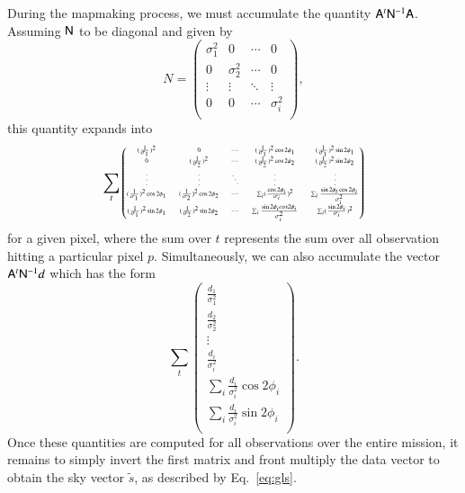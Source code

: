\documentclass{aa}
\newcommand{\A}[0]{\tens{A}}
\newcommand{\N}[0]{\tens{N}}
\begin{document}
During the mapmaking process, we must accumulate the quantity $\A^t\N^{-1}\A$. Assuming $\N$ to be diagonal and given by
\begin{equation}
N = \begin{pmatrix}
\sigma^2_1 & 0 & \cdots & 0 \\
0 & \sigma^2_2 & \cdots & 0 \\
\vdots & \vdots & \ddots & \vdots \\
0 & 0 & \cdots & \sigma^2_i \\
\end{pmatrix},
\end{equation}
this quantity expands into
\begin{equation*}
\begin{tiny}
\sum_t
\begin{pmatrix}
(\frac{1}{\sigma_1})^2 & 0 & \cdots &
(\frac{1}{\sigma_1})^2 \cos2\phi_1 & (\frac{1}{\sigma_1})^2 \sin2\phi_1 \\

0 & (\frac{1}{\sigma_2})^2 & \cdots &
(\frac{1}{\sigma_2})^2 \cos2\phi_2 & (\frac{1}{\sigma_2})^2 \sin2\phi_2 \\

\vdots & \vdots & \ddots & \vdots & \vdots \\

(\frac{1}{\sigma_1})^2 \cos2\phi_1 & (\frac{1}{\sigma_2})^2 \cos2\phi_2 & \cdots & 
\sum_{i} (\frac{\cos 2\phi_i}{\sigma_i})^2 & \sum_{i} \frac{\sin2\phi_t \cos2\phi_i}{\sigma_i^2}  \\

(\frac{1}{\sigma_1})^2 \sin2\phi_1 & (\frac{1}{\sigma_2})^2 \sin2\phi_2 & \cdots &
\sum_{i} \frac{\sin2\phi_i cos2\phi_i}{\sigma_i^2}  & \sum_{i} (\frac{ \sin 2\phi_i}{\sigma_i})^2
\\
\end{pmatrix}
\end{tiny}
\end{equation*}
for a given pixel, where the sum over $t$ represents the sum over all observation hitting a particular pixel $p$. Simultaneously, we can also accumulate the vector $\A^t\N^{-1}d$ which has the form
\begin{equation}
\sum_t
\begin{pmatrix}
\frac{d_{1}}{\sigma_1^2} \\
\frac{d_{2}}{\sigma_2^2}\\
\vdots\\
\frac{d_{i}}{\sigma_i^2}\\
\sum_i \frac{d_{i}}{\sigma_i^2} \cos2\phi_i\\
\sum_i \frac{d_{i}}{\sigma_i^2} \sin2\phi_i\\
\end{pmatrix}.
\end{equation}
Once these quantities are computed for all observations over the entire mission, it remains to simply invert the first matrix and front multiply the data vector to obtain the sky vector $\tilde{s}$, as described by Eq.~\ref{eq:gls}.
\end{document}
